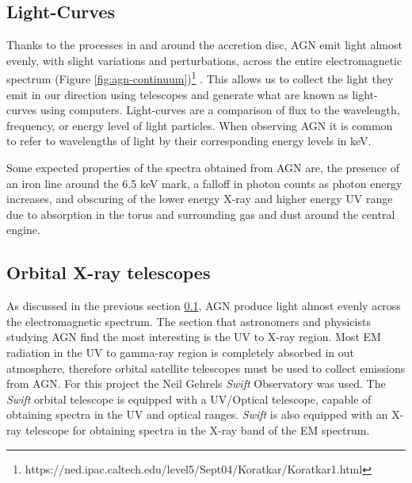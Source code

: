 \documentclass[12pt, oneside]{smuthesis}
\begin{document}
\subsection{\sc Light-Curves} \label{lightcurves}
Thanks to the processes in and around the accretion disc, AGN emit light almost evenly, with slight variations and perturbations, across the entire electromagnetic spectrum (Figure \ref{fig:agn-continuum})\footnote{https://ned.ipac.caltech.edu/level5/Sept04/Koratkar/Koratkar1.html} \cite{koratkar}. This allows us to collect the light they emit in our direction using telescopes and generate what are known as light-curves using computers. Light-curves are a comparison of flux to the wavelength, frequency, or energy level of light particles. When observing AGN it is common to refer to wavelengths of light by their corresponding energy levels in keV.

Some expected properties of the spectra obtained from AGN are, the presence of an iron line around the 6.5 keV mark, a falloff in photon counts as photon energy increases, and obscuring of the lower energy X-ray and higher energy UV range due to absorption in the torus and surrounding gas and dust around the central engine.

\subsection{\sc Orbital X-ray telescopes} \label{xrayTelesopes}

As discussed in the previous section \ref{lightcurves}, AGN produce light almost evenly across the electromagnetic spectrum. The section that astronomers and physicists studying AGN find the most interesting is the UV to X-ray region. Most EM radiation in the UV to gamma-ray region is completely absorbed in out atmosphere, therefore orbital satellite telescopes must be used to collect emissions from AGN. For this project the Neil Gehrels \textit{Swift} Observatory was used. The \textit{Swift} orbital telescope is equipped with a UV/Optical telescope, capable of obtaining spectra in the UV and optical ranges. \textit{Swift} is also equipped with an X-ray telescope for obtaining spectra in the X-ray band of the EM spectrum. 
\end{document}
